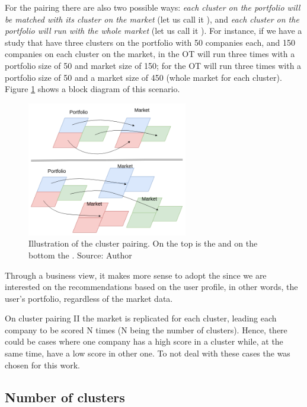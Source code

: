 For the pairing there are also two possible ways: \textit{each cluster on the portfolio will be matched with its cluster on the market} (let us call it \textbf{\nameClusterPairingA{}}), and \textit{each cluster on the portfolio will run with the whole market} (let us call it \textbf{\nameClusterPairingB{}}). For instance, if we have a study that have three clusters on the portfolio with 50 companies each, and 150 companies on each cluster on the market, in \nameClusterPairingA{} the OT will run three times with a portfolio size of 50 and market size of 150; for \nameClusterPairingB{} the OT will run three times with a portfolio size of 50 and a market size of 450 (whole market for each cluster). Figure \ref{fig:cluster-pairing} shows a block diagram of this scenario.

\begin{figure}[h]
   \centering
   \includegraphics[width=7cm]{fig/ch3-cluster-pairing.png}
   \caption{Illustration of the cluster pairing. On the top is the \nameClusterPairingA{} and on the bottom the \nameClusterPairingB{}. Source: Author}
   \label{fig:cluster-pairing}
\end{figure}

Through a business view, it makes more sense to adopt the \textbf{\nameClusterStrategyA{}} since we are interested on the recommendations based on the user profile, in other words, the user's portfolio, regardless of the market data. 

On cluster pairing II the market is replicated for each cluster, leading each company to be scored N times (N being the number of clusters). Hence, there could be cases where one company has a high score in a cluster while, at the same time, have a low score in other one. To not deal with these cases the \textbf{\nameClusterPairingA{}} was chosen for this work.

\subsection{Number of clusters}

